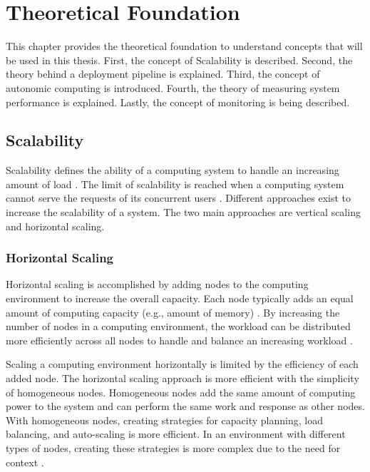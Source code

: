 \chapter{Theoretical Foundation}
\label{chap:02_foundation}


This chapter provides the theoretical foundation to understand concepts that will be used in this thesis. First, the concept of Scalability is described. Second, the theory behind a deployment pipeline is explained. Third, the concept of autonomic computing is  introduced. Fourth, the theory of measuring system performance is explained. Lastly, the concept of monitoring is being described.


\section{Scalability}
\label{sec:02_foundations_scalability}
Scalability defines the ability of a computing system to handle an increasing amount of load \cite{Farcic2017Toolkit21}. 
The limit of scalability is reached when a computing system cannot serve the requests of its concurrent users \cite{Wilder2012CloudPatterns}.
Different approaches exist to increase the scalability of a system. The two main approaches are vertical scaling and horizontal scaling.


\subsection{Horizontal Scaling}
\label{subsec:02_foundations_scalability_horizontal-scaling}
Horizontal scaling is accomplished by adding nodes to the computing environment to increase the overall capacity.
Each node typically adds an equal amount of computing capacity (e.g., amount of memory) \cite{Wilder2012CloudPatterns}.
By increasing the number of nodes in a computing environment, the workload can be distributed more efficiently across all nodes to handle and balance an increasing workload \cite{Wilder2012CloudPatterns, Abbott2015ScalabilityArt}.


Scaling a computing environment horizontally is limited by the efficiency of each added node.
The horizontal scaling approach is more efficient with the simplicity of homogeneous nodes.
Homogeneous nodes add the same amount of computing power to the system and can perform the same work and response as other nodes.
With homogeneous nodes, creating strategies for capacity planning, load balancing, and auto-scaling is more efficient.
In an environment with different types of nodes, creating these strategies is more complex due to the need for context \cite{Wilder2012CloudPatterns}.


